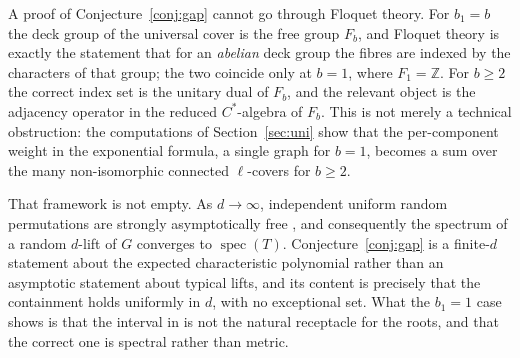 \documentclass[11pt]{article}
\theoremstyle{remark}
\begin{document}
A proof of Conjecture~\ref{conj:gap} cannot go through Floquet theory. For
$b_1=b$ the deck group of the universal cover is the free group $F_b$, and
Floquet theory is exactly the statement that for an \emph{abelian} deck group
the fibres are indexed by the characters of that group; the two coincide only
at $b=1$, where $F_1=\mathbb{Z}$. For $b\ge2$ the correct index set is the
unitary dual of $F_b$, and the relevant object is the adjacency operator in the
reduced $C^*$-algebra of $F_b$. This is not merely a technical obstruction: the
computations of Section~\ref{sec:uni} show that the per-component weight in the
exponential formula, a single graph for $b=1$, becomes a sum over the many
non-isomorphic connected $\ell$-covers for $b\ge2$.

That framework is not empty. As $d\to\infty$, independent uniform random
permutations are strongly asymptotically free \cite{BC}, and consequently the
spectrum of a random $d$-lift of $G$ converges to $\operatorname{spec}(T)$.
Conjecture~\ref{conj:gap} is a finite-$d$ statement about the expected
characteristic polynomial rather than an asymptotic statement about typical
lifts, and its content is precisely that the containment holds uniformly in
$d$, with no exceptional set. What the $b_1=1$ case shows is that the interval
in \cite{HPS} is not the natural receptacle for the roots, and that the correct
one is spectral rather than metric.
\end{document}
